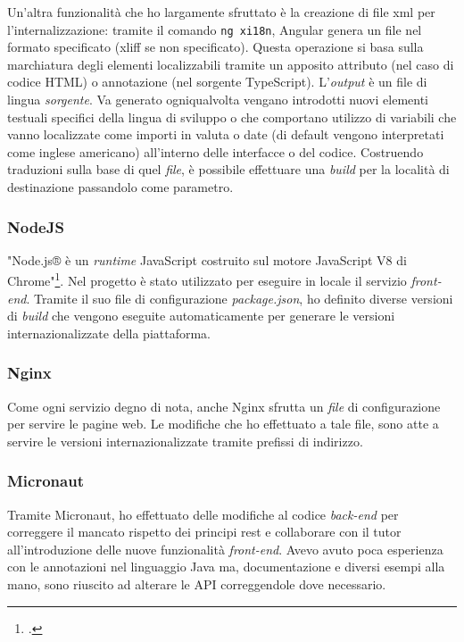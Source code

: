 Un'altra funzionalità che ho largamente sfruttato è la creazione di file \acrshort{xml} per l'internalizzazione: tramite il comando \verb|ng xi18n|, Angular genera un file nel formato specificato (\acrshort{xliff} se non specificato). Questa operazione si basa sulla marchiatura degli elementi localizzabili tramite un apposito attributo (nel caso di codice HTML) o annotazione (nel sorgente TypeScript). L'\textit{output} è un file di lingua \emph{sorgente}. Va generato ogniqualvolta vengano introdotti nuovi elementi testuali specifici della lingua di sviluppo o che comportano utilizzo di variabili che vanno localizzate come importi in valuta o date (di default vengono interpretati come inglese americano) all'interno delle interfacce o del codice. Costruendo traduzioni sulla base di quel \textit{file}, è possibile effettuare una \textit{build} per la località di destinazione passandolo come parametro.
\subsubsection{NodeJS}
"Node.js® è un \textit{runtime} JavaScript costruito sul motore JavaScript V8 di Chrome"\footcite{site:nodeJS}. Nel progetto è stato utilizzato per eseguire in locale il servizio \textit{front-end}. Tramite il suo file di configurazione \emph{package.json}, ho definito diverse versioni di \textit{build} che vengono eseguite automaticamente per generare le versioni internazionalizzate della piattaforma.
\subsubsection{Nginx}
Come ogni servizio degno di nota, anche Nginx sfrutta un \textit{file} di configurazione per servire le pagine web. Le modifiche che ho effettuato a tale file, sono atte a servire le versioni internazionalizzate tramite prefissi di indirizzo.
\subsubsection{Micronaut}
Tramite Micronaut, ho effettuato delle modifiche al codice \textit{back-end} per correggere il mancato rispetto dei principi \acrshort{rest} e collaborare con il tutor all'introduzione delle nuove funzionalità \textit{front-end}. Avevo avuto poca esperienza con le annotazioni nel linguaggio Java ma, documentazione e diversi esempi alla mano, sono riuscito ad alterare le API correggendole dove necessario.

